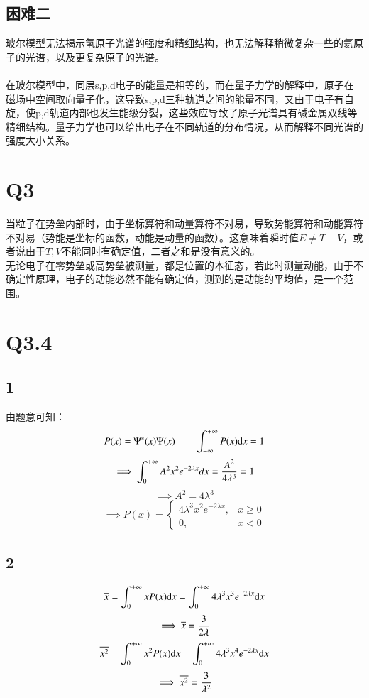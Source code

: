 \documentclass[UTF8,9pt]{ctexart}
\begin{document}
        \subsection{困难二}
            玻尔模型无法揭示氢原子光谱的强度和精细结构，也无法解释稍微复杂一些的氦原子的光谱，以及更复杂原子的光谱。
            \\
            \\
            在玻尔模型中，同层s,p,d电子的能量是相等的，而在量子力学的解释中，原子在磁场中空间取向量子化，这导致s,p,d三种轨道之间的能量不同，又由于电子有自旋，使p,d轨道内部也发生能级分裂，这些效应导致了原子光谱具有碱金属双线等精细结构。量子力学也可以给出电子在不同轨道的分布情况，从而解释不同光谱的强度大小关系。
    \section{Q3}
        当粒子在势垒内部时，由于坐标算符和动量算符不对易，导致势能算符和动能算符不对易（势能是坐标的函数，动能是动量的函数）。这意味着瞬时值$E\neq T+V$，或者说由于$T, V$不能同时有确定值，二者之和是没有意义的。\\
        无论电子在零势垒或高势垒被测量，都是位置的本征态，若此时测量动能，由于不确定性原理，电子的动能必然不能有确定值，测到的是动能的平均值，是一个范围。
    \section{Q3.4}
        \subsection{1}
            由题意可知：
            $$P(x)=\Psi^*(x)\Psi(x) \qquad \int_{-\infty}^{+\infty} P(x)\mathrm{d} x=1$$
            $$\implies \int_{0}^{+\infty}A^2x^2e^{-2\lambda x}dx=\frac{A^2}{4 \lambda^3}=1$$
            $$\implies A^2=4\lambda^3$$
            $$\implies P(x)=\left\{\begin{matrix}
                4\lambda^3 x^2e^{-2\lambda x},& x\geq 0\\
                0, &x < 0
            \end{matrix}\right.$$
        \subsection{2}
            $$\overline{x}=\int_0^{+\infty} xP(x)\mathrm{d} x = \int_0^{+\infty} 4\lambda^3 x^3e^{-2\lambda x}\mathrm{d} x$$
            $$\implies \overline{x}=\frac{3}{2\lambda}$$
            $$\overline{x^2}=\int_0^{+\infty} x^2P(x)\mathrm{d} x = \int_0^{+\infty} 4\lambda^3 x^4e^{-2\lambda x}\mathrm{d} x$$
            $$\implies \overline{x^2}=\frac{3}{\lambda^2}$$
\end{document}
